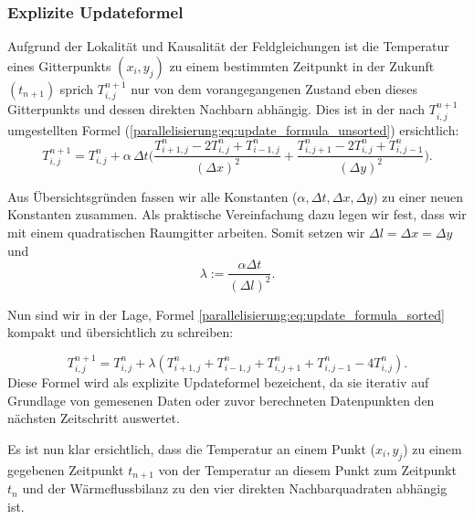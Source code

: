 \subsubsection{Explizite Updateformel}
\label{parallelisierung:sec:update_formel}


Aufgrund der Lokalität und Kausalität der Feldgleichungen ist die Temperatur eines Gitterpunkts \( (x_i, y_j)\) zu einem bestimmten Zeitpunkt in der Zukunft \( (t_{n+1})\) sprich \(T_{i,j}^{n+1}\) nur von dem  vorangegangenen Zustand eben dieses Gitterpunkts und dessen direkten Nachbarn abhängig.
Dies ist  in der nach \(T_{i,j}^{n+1}\) umgestellten Formel (\ref{parallelisierung:eq:update_formula_unsorted}) ersichtlich:
\begin{equation}
	\label{parallelisierung:eq:update_formula_sorted}
	T_{i,j}^{n+1}
	=
	T_{i,j}^n
	+
	\alpha \, \Delta t \biggl(
	\frac{T_{i+1,j}^n - 2 T_{i,j}^n + T_{i-1,j}^n}{(\Delta x)^2}
	+
	\frac{T_{i,j+1}^n - 2 T_{i,j}^n + T_{i,j-1}^n}{(\Delta y)^2}
	\biggr).
\end{equation}

Aus Übersichtsgründen fassen wir alle Konstanten (\(\alpha, \Delta t, \Delta x, \Delta y) \) zu einer neuen Konstanten zusammen.
Als praktische Vereinfachung dazu legen wir fest, dass wir mit einem quadratischen Raumgitter arbeiten. Somit setzen wir  \(\Delta l = \Delta x = \Delta y\) und
\begin{equation}
	\label{parallelisierung:eq:lambda}
	\lambda 
	:= 
	\frac{\alpha \Delta t}{(\Delta l)^2}.
\end{equation}

Nun sind wir in der Lage, Formel \eqref{parallelisierung:eq:update_formula_sorted} kompakt und übersichtlich zu schreiben:

\begin{equation}
	\label{parallelisierung:eq:update_formel}
	T_{i,j}^{n+1}
	=
	T_{i,j}^n +
	\lambda \left(
	T_{i+1,j}^n + T_{i-1,j}^n + T_{i,j+1}^n + T_{i,j-1}^n - 4 T_{i,j}^n
	\right).
\end{equation}
Diese Formel wird als explizite Updateformel bezeichent, da sie iterativ auf Grundlage von gemesenen Daten oder zuvor berechneten Datenpunkten den nächsten Zeitschritt auswertet.

Es ist nun klar ersichtlich, dass die Temperatur an einem Punkt (\(x_i, y_j\)) zu einem gegebenen Zeitpunkt \(t_{n+1}\)  von der Temperatur an diesem Punkt zum Zeitpunkt \(t_n\) und der Wärmeflussbilanz zu den vier direkten Nachbarquadraten abhängig ist.

